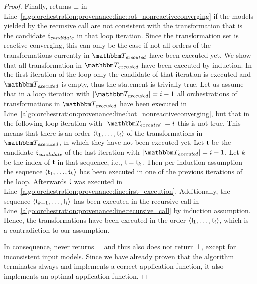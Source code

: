 \begin{proof}
    Finally,  returns $\bot$ in Line~\ref{algo:orchestration:provenance:line:bot_nonreactiveconverging} if the models yielded by the recursive call are not consistent with the transformation that is the candidate $\mathfrak{t}_{\mathit{candidate}}$ in that loop iteration.
    Since the transformation set is reactive converging, this can only be the case if not all orders of the transformations currently in $\provalgexecuted$ have been executed yet.
    We show that all transformation in $\provalgexecuted$ have been executed by induction.
    In the first iteration of the loop only the candidate of that iteration is executed and $\provalgexecuted$ is empty, thus the statement is trivially true.
    Let us assume that in a loop iteration with $\abs{\provalgexecuted} = i-1$ all orchestrations of transformations in $\provalgexecuted$ have been executed in Line~\ref{algo:orchestration:provenance:line:bot_nonreactiveconverging}, but that in the following loop iteration with $\abs{\provalgexecuted} = i$ this is not true.
    This means that there is an order $\langle \mathfrak{t}_{1}, \dots, \mathfrak{t}_{i} \rangle$ of the transformations in $\provalgexecuted$, in which they have not been executed yet.
    Let $\mathfrak{t}$ be the candidate $\mathfrak{t}_{\mathit{candidate}}$ of the last iteration with $\abs{\provalgexecuted} = i-1$. Let $k$ be the index of $\mathfrak{t}$ in that sequence, i.e., $\mathfrak{t} = \mathfrak{t}_{k}$. Then per induction assumption the sequence $\langle \mathfrak{t}_{1}, \dots, \mathfrak{t}_{k} \rangle$ has been executed in one of the previous iterations of the loop. 
    Afterwards $\mathfrak{t}$ was executed in Line~\ref{algo:orchestration:provenance:line:first_execution}.
    Additionally, the sequence $\langle \mathfrak{t}_{k+1}, \dots, \mathfrak{t}_{i} \rangle$ has been executed in the recursive call in Line~\ref{algo:orchestration:provenance:line:recursive_call} by induction assumption.
    Hence, the transformations have been executed in the order $\langle \mathfrak{t}_{1}, \dots, \mathfrak{t}_{i} \rangle$, which is a contradiction to our assumption.

    In consequence,  never returns $\bot$ and thus also  does not return $\bot$, except for inconsistent input models. Since we have already proven that the algorithm terminates always and implements a correct application function, it also implements an optimal application function.
\end{proof}

